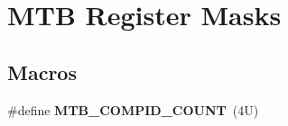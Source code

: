 \hypertarget{group___m_t_b___register___masks}{}\section{M\+TB Register Masks}
\label{group___m_t_b___register___masks}
\subsection*{Macros}
\begin{DoxyCompactItemize}
\item 
\mbox{\label{group___m_t_b___register___masks_gae03ed5b4b00076e5ba5cbd7c404b4c73}} 
\#define {\bfseries M\+T\+B\+\_\+\+C\+O\+M\+P\+I\+D\+\_\+\+C\+O\+U\+NT}~(4\+U)
\end{DoxyCompactItemize}
